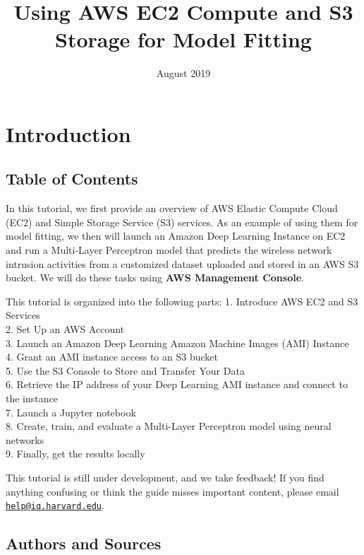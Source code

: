 \documentclass[]{book}
\title{Using AWS EC2 Compute and S3 Storage for Model Fitting}
\author{}
\date{August 2019}
\begin{document}
\maketitle

{
\setcounter{tocdepth}{1}
\tableofcontents
}
\hypertarget{introduction}{%
\chapter*{Introduction}\label{introduction}}

\hypertarget{table-of-contents}{%
\section*{Table of Contents}\label{table-of-contents}}

In this tutorial, we first provide an overview of AWS Elastic Compute Cloud (EC2) and Simple Storage Service (S3) services. As an example of using them for model fitting, we then will launch an Amazon Deep Learning Instance on EC2 and run a Multi-Layer Perceptron model that predicts the wireless network intrusion activities from a customized dataset uploaded and stored in an AWS S3 bucket. We will do these tasks using \textbf{AWS Management Console}.

This tutorial is organized into the following parts:
1. Introduce AWS EC2 and S3 Services\\
2. Set Up an AWS Account\\
3. Launch an Amazon Deep Learning Amazon Machine Images (AMI) Instance\\
4. Grant an AMI instance access to an S3 bucket\\
5. Use the S3 Console to Store and Transfer Your Data\\
6. Retrieve the IP address of your Deep Learning AMI instance and connect to the instance\\
7. Launch a Jupyter notebook\\
8. Create, train, and evaluate a Multi-Layer Perceptron model using neural networks\\
9. Finally, get the results locally

This tutorial is still under development, and we take feedback! If you find anything confusing or think the guide misses important content, please email \href{mailto:help@iq.harvard.edu}{\nolinkurl{help@iq.harvard.edu}}.

\hypertarget{authors-and-sources}{%
\section*{Authors and Sources}\label{authors-and-sources}}
\end{document}
